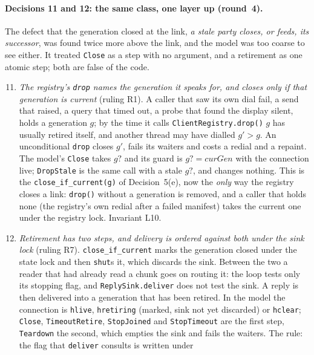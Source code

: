 \documentclass[a4paper,10pt,fleqn]{article}
\begin{document}
\paragraph{Decisions 11 and 12: the same class, one layer up (round~4).}
The defect that the generation closed at the link, \emph{a stale party closes,
or feeds, its successor}, was found twice more above the link, and the model
was too coarse to see either.  It treated \texttt{Close} as a step with no
argument, and a retirement as one atomic step; both are false of the code.
\begin{enumerate}
  \setcounter{enumi}{10}
  \item \emph{The registry's \texttt{drop} names the generation it speaks for,
    and closes only if that generation is current} (ruling R1).  A caller that
    saw its own dial fail, a send that raised, a query that timed out, a probe
    that found the display silent, holds a generation $g$; by the time it calls
    \texttt{ClientRegistry.drop()} $g$ has usually retired itself, and another
    thread may have dialled $g' > g$.  An unconditional \texttt{drop} closes
    $g'$, fails its waiters and costs a redial and a repaint.  The model's
    \texttt{Close} takes $g?$ and its guard is $g? = curGen$ with the
    connection live; \texttt{DropStale} is the same call with a stale $g?$, and
    changes nothing.  This is the \texttt{close\_if\_current(g)} of
    Decision~5(e), now the \emph{only} way the registry closes a link:
    \texttt{drop()} without a generation is removed, and a caller that holds
    none (the registry's own redial after a failed manifest) takes the current
    one under the registry lock.  Invariant L10.
  \item \emph{Retirement has two steps, and delivery is ordered against both
    under the sink lock} (ruling R7).  \texttt{close\_if\_current} marks the
    generation closed under the state lock and then \texttt{shut}s it, which
    discards the sink.  Between the two a reader that had already read a chunk
    goes on routing it: the loop tests only its stopping flag, and
    \texttt{ReplySink.deliver} does not test the sink.  A reply is then
    delivered into a generation that has been retired.  In the model the
    connection is \texttt{hlive}, \texttt{hretiring} (marked, sink not yet
    discarded) or \texttt{hclear}; \texttt{Close}, \texttt{TimeoutRetire},
    \texttt{StopJoined} and \texttt{StopTimeout} are the first step,
    \texttt{Teardown} the second, which empties the sink and fails the
    waiters.  The rule: the flag that \texttt{deliver} consults is written under

\end{enumerate}
\end{document}

